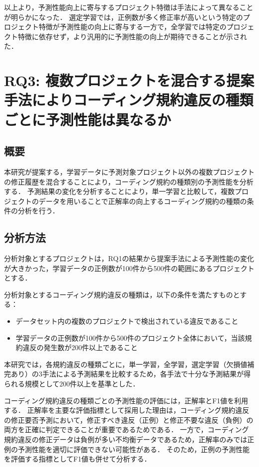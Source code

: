 \documentclass[11pt]{jreport}
\begin{document}
以上より，予測性能向上に寄与するプロジェクト特徴は手法によって異なることが明らかになった．
選定学習では，正例数が多く修正率が高いという特定のプロジェクト特徴が予測性能の向上に寄与する一方で，全学習では特定のプロジェクト特徴に依存せず，より汎用的に予測性能の向上が期待できることが示された．


\chapter{RQ3: 複数プロジェクトを混合する提案手法によりコーディング規約違反の種類ごとに予測性能は異なるか}\label{chap:rq3}

\section{概要}

本研究が提案する，学習データに予測対象プロジェクト以外の複数プロジェクトの修正履歴を混合することにより，コーディング規約の種類別の予測性能を分析する．
予測結果の変化を分析することにより，単一学習と比較して，複数プロジェクトのデータを用いることで正解率の向上するコーディング規約の種類の条件の分析を行う．

\section{分析方法}

分析対象とするプロジェクトは，RQ1の結果から提案手法による予測性能の変化が大きかった，学習データの正例数が100件から500件の範囲にあるプロジェクトとする．

分析対象とするコーディング規約違反の種類は，以下の条件を満たすものとする：
\begin{itemize}
    \item データセット内の複数のプロジェクトで検出されている違反であること
    \item 学習データの正例数が100件から500件のプロジェクト全体において，当該規約違反の発生数が200件以上であること
\end{itemize}

本研究では，各規約違反の種類ごとに，単一学習，全学習，選定学習（欠損値補完あり）の3手法による予測結果を比較するため，各手法で十分な予測結果が得られる規模として200件以上を基準とした．

コーディング規約違反の種類ごとの予測性能の評価には，正解率とF1値を利用する．
正解率を主要な評価指標として採用した理由は，コーディング規約違反の修正要否予測において，修正すべき違反（正例）と修正不要な違反（負例）の両方を正確に判定できることが重要であるためである．
一方で，コーディング規約違反の修正データは負例が多い不均衡データであるため，正解率のみでは正例の予測性能を適切に評価できない可能性がある．
そのため，正例の予測性能を評価する指標としてF1値も併せて分析する．
\end{document}
